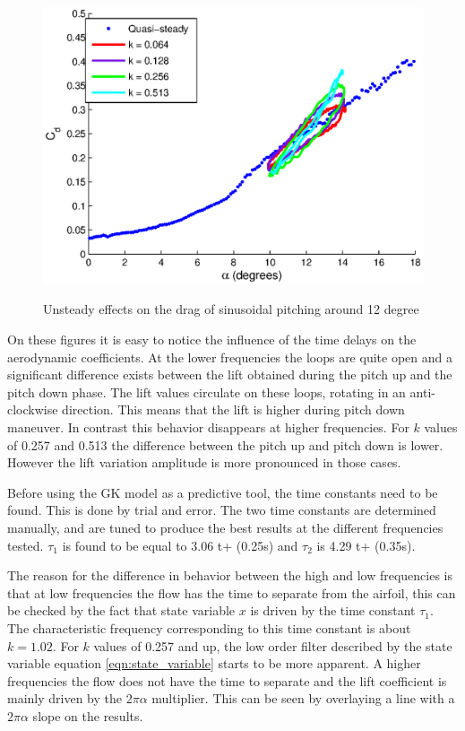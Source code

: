 \begin{figure}[h]
  \begin{center}
    \scalebox{1.0}  
    {\includegraphics{./Figures/Pitching_allcases_CD_12_amp_2.eps}}
  \end{center}
  \caption{Unsteady effects on the drag of sinusoidal pitching around 12 degree} 
  \label{fig:Pitching_allcases_Cd_12}
\end{figure}

\FloatBarrier

\par On these figures it is easy to notice the influence of the time delays on the aerodynamic coefficients.
At the lower frequencies the loops are quite open and a significant difference exists between the lift obtained during the pitch up and the pitch down phase.
The lift values circulate on these loops, rotating in an anti-clockwise direction.
This means that the lift is higher during pitch down maneuver.
In contrast this behavior disappears at higher frequencies.
For $k$ values of 0.257 and 0.513 the difference between the pitch up and pitch down is lower.
However the lift variation amplitude is more pronounced in those cases.

\par Before using the GK model as a predictive tool, the time constants need to be found.
This is done by trial and error.
The two time constants are determined manually, and are tuned to produce the best results at the different frequencies tested.
$\tau_1$ is found to be equal to 3.06 t+ (0.25s) and $\tau_2$ is 4.29 t+ (0.35s).


\par The reason for the difference in behavior between the high and low frequencies is that at low frequencies the flow has the time to separate from the airfoil, this can be checked by the fact that state variable $x$ is driven by the time constant $\tau_1$.
The characteristic frequency corresponding to this time constant is about $k=1.02$.
For $k$ values of 0.257 and up, the low order filter described by the state variable equation \ref{eqn:state_variable} starts to be more apparent.
A higher frequencies the flow does not have the time to separate and the lift coefficient is mainly driven by the $2\pi\alpha$ multiplier.
This can be seen by overlaying a line with a $2\pi\alpha$ slope on the results.

